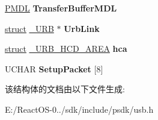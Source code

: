 \begin{DoxyCompactItemize}
\hyperlink{interfacevoid}{P\+M\+DL} {\bfseries Transfer\+Buffer\+M\+DL}
\item 
\mbox{\label{struct___u_r_b___c_o_n_t_r_o_l___t_r_a_n_s_f_e_r_a16580acd9b7ebbc60260296773c15fec}} 
\hyperlink{interfacestruct}{struct} \hyperlink{struct___u_r_b}{\+\_\+\+U\+RB} $\ast$ {\bfseries Urb\+Link}
\item 
\mbox{\label{struct___u_r_b___c_o_n_t_r_o_l___t_r_a_n_s_f_e_r_a8f82f385aca5a808bfa2caca62c71331}} 
\hyperlink{interfacestruct}{struct} \hyperlink{struct___u_r_b___h_c_d___a_r_e_a}{\+\_\+\+U\+R\+B\+\_\+\+H\+C\+D\+\_\+\+A\+R\+EA} {\bfseries hca}
\item 
\mbox{\label{struct___u_r_b___c_o_n_t_r_o_l___t_r_a_n_s_f_e_r_aefde5b23693f3242cda964bb9a12deb6}} 
U\+C\+H\+AR {\bfseries Setup\+Packet} \mbox{[}8\mbox{]}
\end{DoxyCompactItemize}


该结构体的文档由以下文件生成\+:\begin{DoxyCompactItemize}
\item 
E\+:/\+React\+O\+S-\/0../sdk/include/psdk/usb.\+h\end{DoxyCompactItemize}
